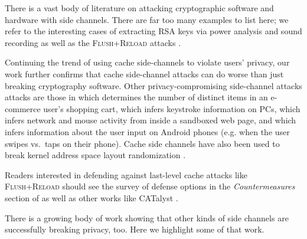\documentclass[letterpaper,twocolumn,10pt]{article}
\begin{document}
There is a vast body of literature on attacking cryptographic software and
hardware with side channels. There are far too many examples to list here; we
refer to the interesting cases of extracting RSA keys via power analysis
\cite{messerges1999power} and sound recording \cite{genkin2013rsa} as well as
the \textsc{Flush+Reload} attacks \cite{yarom2013flush, benger2014ooh,
yarom2014recovering}.

Continuing the trend of using cache side-channels to violate users' privacy, our
work further confirms that cache side-channel attacks can do worse than just
breaking cryptography software. Other privacy-compromising side-channel attacks
attacks are those in \cite{zhang2014cross} which determines the number of
distinct items in an e-commerce user's shopping cart, \cite{gruss2015cache}
which infers keystroke information on PCs, \cite{oren2015spy} which infers
network and mouse activity from inside a sandboxed web page, and
\cite{lipp2015armageddon} which infers information about the user input on
Android phones (e.g. when the user swipes vs.\ taps on their phone).  Cache side
channels have also been used to break kernel address space layout randomization
\cite{hund2013practical}.

Readers interested in defending against last-level cache attacks like
\textsc{Flush+Reload} should see the survey of defense options in the
\emph{Countermeasures} section of \cite{gruss2015cache} as well as other works
like CATalyst \cite{liu2016catalyst}.

There is a growing body of work showing that other kinds of side channels are
successfully breaking privacy, too. Here we highlight some of that work.
\end{document}
